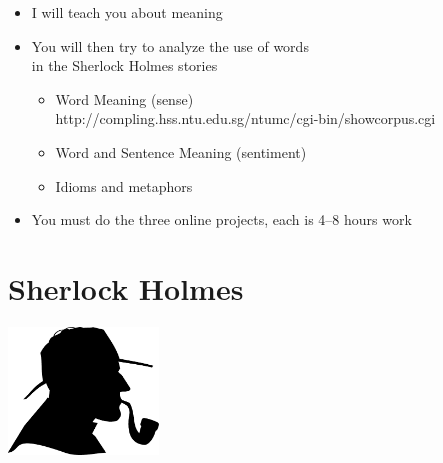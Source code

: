 \documentclass[a4paper,landscape,headrule,footrule,xetex,25pt]{foils}
\begin{document}
\begin{itemize}
\item I will teach you about meaning
\item You will then try to analyze the use of words 
  \\ in the Sherlock Holmes stories
  \begin{itemize}
  \item Word Meaning (sense)
    \\    http://compling.hss.ntu.edu.sg/ntumc/cgi-bin/showcorpus.cgi
    \\  
  \item Word and Sentence Meaning (sentiment)
    \\  
  \item Idioms and metaphors
    \\ 
  \end{itemize}
\item You must do the three online projects, each is 4--8 hours work

\end{itemize}











\section{Sherlock Holmes}
\begin{center}
  \includegraphics[width=0.3\textwidth]{pics/detectiveprofile}
\end{center}
\end{document}
